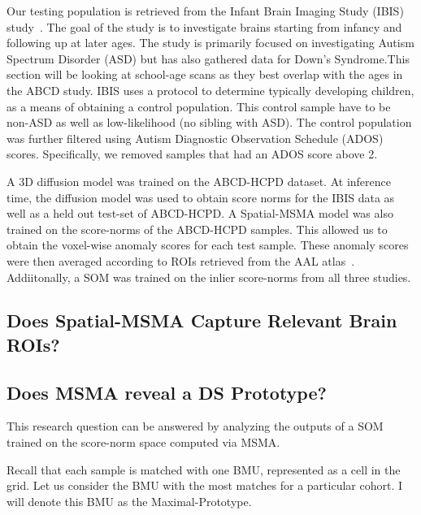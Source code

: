 Our testing population is retrieved from the Infant Brain Imaging Study (IBIS) study~. The goal of the study is to investigate brains starting from infancy and following up at later ages. The study is primarily focused on investigating Autism Spectrum Disorder (ASD) but has also gathered data for Down's Syndrome.This section will be looking at school-age scans as they best overlap with the ages in the ABCD study. IBIS uses a protocol to determine typically developing children, as a means of obtaining a control population. This control sample have to be non-ASD as well as low-likelihood (no sibling with ASD). The control population was further filtered using Autism Diagnostic Observation Schedule (ADOS)~ scores. Specifically, we removed samples that had an ADOS score above 2.

A 3D diffusion model was trained on the ABCD-HCPD dataset. At inference time, the diffusion model was used to obtain score norms for the IBIS data as well as a held out test-set of ABCD-HCPD. A Spatial-MSMA model was also trained on the score-norms of the ABCD-HCPD samples. This allowed us to obtain the voxel-wise anomaly scores for each test sample. These anomaly scores were then averaged according to ROIs retrieved from the AAL atlas~\cite{ROLLS2020116189}. Addiitonally, a SOM was trained on the inlier score-norms from all three studies. 


\subsection*{Does Spatial-MSMA Capture Relevant Brain ROIs?}


\subsection*{Does MSMA reveal a DS Prototype?}

This research question can be answered by analyzing the outputs of a SOM trained on the score-norm space computed via MSMA. 

Recall that each sample is matched with one BMU, represented as a cell in the grid. Let us consider the BMU with the most matches for a particular cohort. I will denote this BMU as the Maximal-Prototype. 

